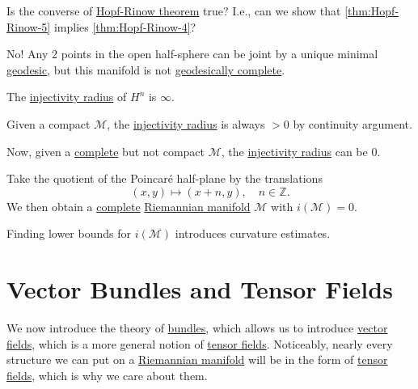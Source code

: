 \begin{problem*}
	Is the converse of \hyperref[thm:Hopf-Rinow]{Hopf-Rinow theorem} true? I.e., can we show that \autoref{thm:Hopf-Rinow-5} implies \autoref{thm:Hopf-Rinow-4}?
\end{problem*}
\begin{answer}
	No! Any \(2\) points in the open half-sphere can be joint by a unique minimal \hyperref[def:geodesic]{geodesic}, but this manifold is not \hyperref[def:geodesically-complete]{geodesically complete}.
\end{answer}

\begin{eg}
	The \hyperref[def:injectivity-radius]{injectivity radius} of \(H^n\) is \(\infty \).
\end{eg}

\begin{remark}
	Given a compact \(\mathcal{M} \), the \hyperref[def:injectivity-radius]{injectivity radius} is always \(> 0\) by continuity argument.
\end{remark}

Now, given a \hyperref[def:geodesically-complete]{complete} but not compact \(\mathcal{M} \), the \hyperref[def:injectivity-radius]{injectivity radius} can be \(0\).

\begin{eg}
	Take the quotient of the Poincaré half-plane by the translations
	\[
		(x, y) \mapsto (x+n, y),\quad n\in \mathbb{Z} .
	\]
	We then obtain a \hyperref[def:geodesically-complete]{complete} \hyperref[def:Riemannian-manifold]{Riemannian manifold} \(\mathcal{M} \) with \(i(\mathcal{M} ) = 0\).
\end{eg}

\begin{note}
	Finding lower bounds for \(i(\mathcal{M})\) introduces curvature estimates.
\end{note}

\section{Vector Bundles and Tensor Fields}
We now introduce the theory of \hyperref[def:bundle]{bundles}, which allows us to introduce \hyperref[def:vector-field*]{vector fields}, which is a more general notion of \hyperref[def:tensor-field]{tensor fields}. Noticeably, nearly every structure we can put on a \hyperref[def:Riemannian-manifold]{Riemannian manifold} will be in the form of \hyperref[def:tensor-field]{tensor fields}, which is why we care about them.

